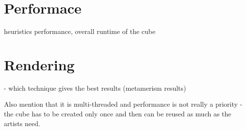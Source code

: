 \section{Performace}

heuristics performance, overall runtime of the cube

\section{Rendering}

- which technique gives the best results (metamerism results)


Also mention that it is multi-threaded and performance is not really a priority - the cube has to be created only once and then can be reused as much as the artists need.
